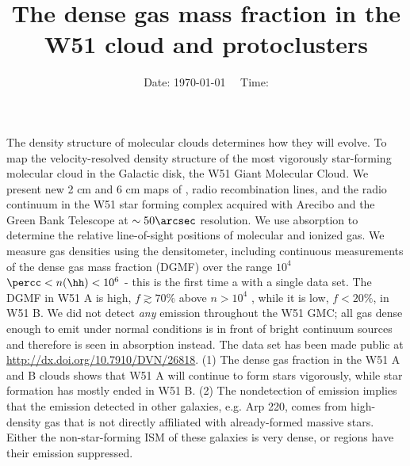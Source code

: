 



\title{The dense gas mass fraction in the W51 cloud and protoclusters}



\date{Date: \today ~~ Time: \currenttime}

%

\abstract
{The density structure of molecular clouds determines how they will evolve.}
{To map the velocity-resolved density structure of the most vigorously
star-forming molecular cloud in the Galactic disk, the W51 Giant Molecular
Cloud.}
{
We present new 2 cm and 6 cm maps of \formaldehyde, radio recombination lines,
and the radio continuum in the W51 star forming complex acquired with Arecibo
and the Green Bank Telescope at $\sim50\arcsec$ resolution.
We use \formaldehyde absorption to determine the relative line-of-sight
positions of molecular and ionized gas.  We measure gas densities using the
\formaldehyde densitometer, including continuous measurements of the dense gas
mass
fraction (DGMF) over the range $10^4$ $\percc< n(\hh) < 10^6$ \percc - this is
the first time a  with a single data set.}
{The DGMF in W51 A is high, $f\gtrsim70\%$ above $n>10^4$
\percc, while it is low, $f<20\%$, in W51 B.
We did not detect \emph{any} \formaldehyde emission throughout the W51 GMC; all
gas dense enough to emit under normal conditions is in front of bright
continuum sources and therefore is seen in absorption instead.  
The data set has been made public at \protect\url{http://dx.doi.org/10.7910/DVN/26818}.
}
{(1) The dense gas fraction in the W51 A and B clouds shows that W51 A will
continue to form stars vigorously, while star formation has mostly ended in W51
B.
(2) The nondetection of \formaldehyde emission implies that the  emission
detected in other galaxies, e.g. Arp 220, comes from high-density gas that is
not directly affiliated with already-formed massive stars.  Either the
non-star-forming ISM of these galaxies is very dense, or \hii regions have
their emission suppressed.
}


